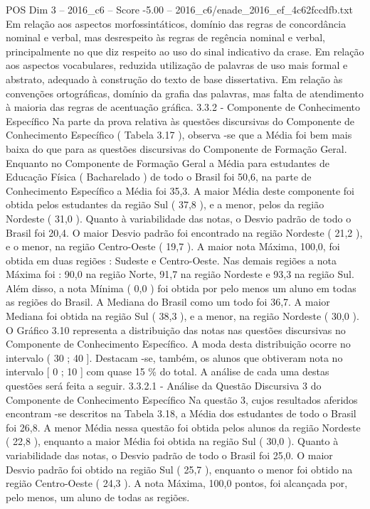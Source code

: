 \begin{textsample}{POS Dim 3 – 2016\_c6 – Score -5.00 – 2016\_c6/enade\_2016\_ef\_4c62fccdfb.txt}
Em relação aos aspectos morfossintáticos, domínio das regras de concordância nominal e verbal, mas desrespeito às regras de regência nominal e verbal, principalmente no que diz respeito ao uso do sinal indicativo da crase.
Em relação aos aspectos vocabulares, reduzida utilização de palavras de uso mais formal e abstrato, adequado à construção do texto de base dissertativa.
Em relação às convenções ortográficas, domínio da grafia das palavras, mas falta de atendimento à maioria das regras de acentuação gráfica. 3.3.2 - Componente de Conhecimento Específico Na parte da prova relativa às questões discursivas do Componente de Conhecimento Específico ( Tabela 3.17 ), observa -se que a Média foi bem mais baixa do que para as questões discursivas do Componente de Formação Geral.
Enquanto no Componente de Formação Geral a Média para estudantes de Educação Física ( Bacharelado ) de todo o Brasil foi 50,6, na parte de Conhecimento Específico a Média foi 35,3.
A maior Média deste componente foi obtida pelos estudantes da região Sul ( 37,8 ), e a menor, pelos da região Nordeste ( 31,0 ).
Quanto à variabilidade das notas, o Desvio padrão de todo o Brasil foi 20,4.
O maior Desvio padrão foi encontrado na região Nordeste ( 21,2 ), e o menor, na região Centro-Oeste ( 19,7 ).
A maior nota Máxima, 100,0, foi obtida em duas regiões : Sudeste e Centro-Oeste.
Nas demais regiões a nota Máxima foi : 90,0 na região Norte, 91,7 na região Nordeste e 93,3 na região Sul.
Além disso, a nota Mínima ( 0,0 ) foi obtida por pelo menos um aluno em todas as regiões do Brasil.
A Mediana do Brasil como um todo foi 36,7.
A maior Mediana foi obtida na região Sul ( 38,3 ), e a menor, na região Nordeste ( 30,0 ).
O Gráfico 3.10 representa a distribuição das notas nas questões discursivas no Componente de Conhecimento Específico.
A moda desta distribuição ocorre no intervalo ( 30 ; 40 ].
Destacam -se, também, os alunos que obtiveram nota no intervalo [ 0 ; 10 ] com quase 15 \% do total.
A análise de cada uma destas questões será feita a seguir. 3.3.2.1 - Análise da Questão Discursiva 3 do Componente de Conhecimento Específico Na questão 3, cujos resultados aferidos encontram -se descritos na Tabela 3.18, a Média dos estudantes de todo o Brasil foi 26,8.
A menor Média nessa questão foi obtida pelos alunos da região Nordeste ( 22,8 ), enquanto a maior Média foi obtida na região Sul ( 30,0 ).
Quanto à variabilidade das notas, o Desvio padrão de todo o Brasil foi 25,0.
O maior Desvio padrão foi obtido na região Sul ( 25,7 ), enquanto o menor foi obtido na região Centro-Oeste ( 24,3 ).
A nota Máxima, 100,0 pontos, foi alcançada por, pelo menos, um aluno de todas as regiões.

\end{textsample}
